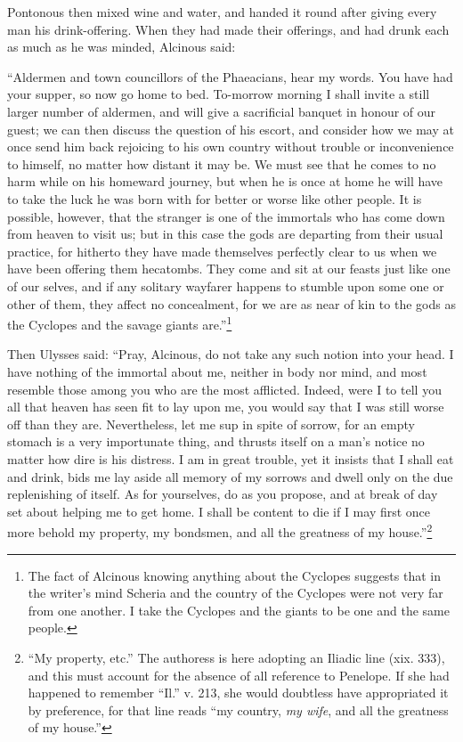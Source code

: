 Pontonous then mixed wine and water, and handed it round after giving every man
his drink-offering. When they had made their offerings, and had drunk each as
much as he was minded, Alcinous said:

“Aldermen and town councillors of the Phaeacians, hear my words. You have had
your supper, so now go home to bed. To-morrow morning I shall invite a still
larger number of aldermen, and will give a sacrificial banquet in honour of our
guest; we can then discuss the question of his escort, and consider how we may
at once send him back rejoicing to his own country without trouble or
inconvenience to himself, no matter how distant it may be. We must see that he
comes to no harm while on his homeward journey, but when he is once at home he
will have to take the luck he was born with for better or worse like other
people. It is possible, however, that the stranger is one of the immortals who
has come down from heaven to visit us; but in this case the gods are departing
from their usual practice, for hitherto they have made themselves perfectly
clear to us when we have been offering them hecatombs. They come and sit at our
feasts just like one of our selves, and if any solitary wayfarer happens to
stumble upon some one or other of them, they affect no concealment, for we are
as near of kin to the gods as the Cyclopes and the savage giants are.”\footnote{The fact of Alcinous knowing anything about the Cyclopes suggests that in
the writer’s mind Scheria and the country of the Cyclopes were not very far
from one another. I take the Cyclopes and the giants to be one and the same
people.}

Then Ulysses said: “Pray, Alcinous, do not take any such notion into your head.
I have nothing of the immortal about me, neither in body nor mind, and most
resemble those among you who are the most afflicted. Indeed, were I to tell you
all that heaven has seen fit to lay upon me, you would say that I was still
worse off than they are. Nevertheless, let me sup in spite of sorrow, for an
empty stomach is a very importunate thing, and thrusts itself on a man’s notice
no matter how dire is his distress. I am in great trouble, yet it insists that
I shall eat and drink, bids me lay aside all memory of my sorrows and dwell
only on the due replenishing of itself. As for yourselves, do as you propose,
and at break of day set about helping me to get home. I shall be content to die
if I may first once more behold my property, my bondsmen, and all the greatness
of my house.”\footnote{“My property, etc.” The authoress is here adopting an Iliadic line (xix.
333), and this must account for the absence of all reference to Penelope. If
she had happened to remember “Il.” v. 213, she would doubtless have
appropriated it by preference, for that line reads “my country, \emph{my
wife}, and all the greatness of my house.”}

